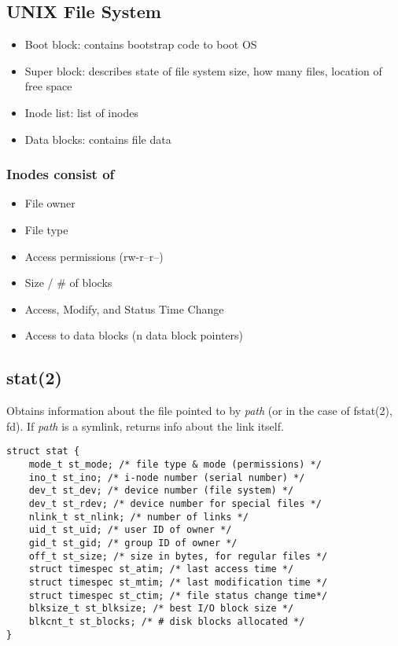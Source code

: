 \documentclass[10pt]{article}
\begin{document}
\footnotesize
\begin{multicols}{2}
    \begin{minipage}{0.8\columnwidth}
        \vspace*{-70em}
        \section*{UNIX File System}
        \begin{itemize}
            \setlength\itemsep{0em}
            \item Boot block: contains bootstrap code to boot OS
            \item Super block: describes state of file system size, how many files, location of free space
            \item Inode list: list of inodes
            \item Data blocks: contains file data
        \end{itemize}
        \setlength\itemsep{-0.3em}
        \subsubsection*{Inodes consist of}
        \begin{itemize}
            \setlength\itemsep{0em}
            \item File owner
            \item File type
            \item Access permissions (rw-r--r--)
            \item Size / \# of blocks
            \item Access, Modify, and Status Time Change
            \item Access to data blocks (n data block pointers)
        \end{itemize}
        \vspace*{-2em}
        \subsection*{stat(2)}
        Obtains information about the file pointed to by \textit{path}
        (or in the case of fstat(2), fd).
        If \textit{path} is a symlink, returns info about the link itself.
        \begin{lstlisting}
struct stat {
    mode_t st_mode; /* file type & mode (permissions) */
    ino_t st_ino; /* i-node number (serial number) */
    dev_t st_dev; /* device number (file system) */
    dev_t st_rdev; /* device number for special files */
    nlink_t st_nlink; /* number of links */
    uid_t st_uid; /* user ID of owner */
    gid_t st_gid; /* group ID of owner */
    off_t st_size; /* size in bytes, for regular files */
    struct timespec st_atim; /* last access time */
    struct timespec st_mtim; /* last modification time */
    struct timespec st_ctim; /* file status change time*/
    blksize_t st_blksize; /* best I/O block size */
    blkcnt_t st_blocks; /* # disk blocks allocated */
}


\end{lstlisting}
\end{minipage}
\end{multicols}
\end{document}

